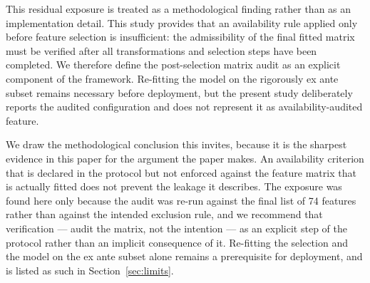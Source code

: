 \documentclass[sn-vancouver,Numbered]{sn-jnl}
\begin{document}
This residual exposure is treated as a methodological finding rather than as an implementation detail. This study provides that an availability rule applied only before feature selection is insufficient: the admissibility of the final fitted matrix must be verified after all transformations and selection steps have been completed. We therefore define the post-selection matrix audit as an explicit component of the framework. Re-fitting the model on the rigorously ex ante subset remains necessary before deployment, but the present study deliberately reports the audited configuration and does not represent it as availability-audited feature.

We draw the methodological conclusion this invites, because it is the sharpest evidence in this paper for the argument the paper makes. An availability criterion that is declared in the protocol but not enforced against the feature matrix that is actually fitted does not prevent the leakage it describes. The exposure was found here only because the audit was re-run against the final list of 74 features rather than against the intended exclusion rule, and we recommend that verification --- audit the matrix, not the intention --- as an explicit step of the protocol rather than an implicit consequence of it. Re-fitting the selection and the model on the ex ante subset alone remains a prerequisite for deployment, and is listed as such in Section~\ref{sec:limits}.
\end{document}

